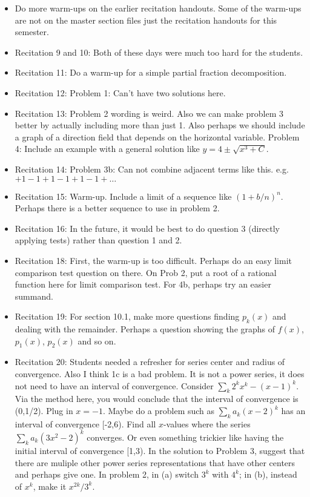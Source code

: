 \documentclass{article}
\begin{document}
\large

\begin{itemize}
\item Do more warm-ups on the earlier recitation handouts. Some of the warm-ups are not on the master section files just the recitation handouts for this semester. 
\item Recitation 9 and 10: Both of these days were much too hard for the students. 
\item Recitation 11: Do a warm-up for a simple partial fraction decomposition.
\item Recitation 12: Problem 1: Can't have two solutions here.
\item Recitation 13: Problem 2 wording is weird. Also we can make problem 3 better by actually including more than just 1. Also perhaps we should include a graph of a direction field that depends on the horizontal variable. Problem 4: Include an example with a general solution like $y=4\pm \sqrt{x^3+C}$. 
\item Recitation 14: Problem 3b: Can not combine adjacent terms like this. e.g. $+1-1+1-1+1-1+\ldots$
\item Recitation 15: Warm-up. Include a limit of a sequence like $(1+b/n)^n$. Perhaps there is a better sequence to use in problem 2.
\item Recitation 16: In the future, it would be best to do question 3 (directly applying tests) rather than question 1 and 2.
\item Recitation 18: First, the warm-up is too difficult. Perhaps do an easy limit comparison test question on there. On Prob 2, put a root of a rational function here for limit comparison test. For 4b, perhaps try an easier summand. 
\item Recitation 19: For section 10.1, make more questions finding $p_k(x)$ and dealing with the remainder. Perhaps a question showing the graphs of $f(x)$, $p_1(x)$, $p_2(x)$ and so on.  
\item Recitation 20: Students needed a refresher for series center and radius of convergence. Also I think 1c is a bad problem. It is not a power series, it does not need to have an interval of convergence. Consider $\sum_k 2^k x^k - (x-1)^k$. Via the method here, you would conclude that the interval of convergence is (0,1/2). Plug in $x=-1$. Maybe do a problem such as $\sum_k a_k (x-2)^k$ has an interval of convergence [-2,6). Find all $x$-values where the series $\sum_k a_k (3x^2-2)^k$ converges. Or even something trickier like having the initial interval of convergence [1,3).  In the solution to Problem 3, suggest that there are muliple other power series representations that have other centers and perhaps give one. In problem 2, in (a) switch $3^k$ with $4^k$; in (b), instead of $x^k$, make it $x^{2k}/3^k$. 

\end{itemize}
\end{document}
